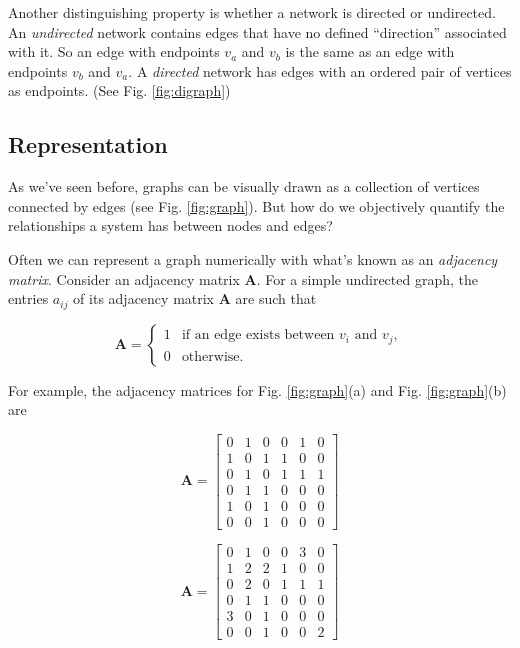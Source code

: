 \documentclass{article}
\begin{document}
Another distinguishing property is whether a network is directed or undirected.  An \textit{undirected} network contains edges that have no defined ``direction'' associated with it. So an edge with endpoints $v_a$ and $v_b$ is the same as an edge with endpoints $v_b$ and $v_a$.  A \textit{directed} network has edges with an ordered pair of vertices as endpoints.  (See Fig. \ref{fig:digraph})


\subsection{Representation}
As we've seen before, graphs can be visually drawn as a collection of vertices connected by edges (see Fig. \ref{fig:graph}).  But how do we objectively quantify the relationships a system has between nodes and edges?  

Often we can represent a graph numerically with what's known as an \textit{adjacency matrix}. Consider an adjacency matrix $\textbf{A}$.  For a simple undirected graph, the entries $a_{ij}$ of its adjacency matrix $\textbf{A}$ are such that 


\begin{equation}
 \textbf{A} =
\begin{cases}
1 & \text{if an edge exists between $v_i$ and $v_j$},\\
0 & \text{otherwise}.
\end{cases}
\end{equation}

\vspace{0.4cm}

For example, the adjacency matrices for Fig. \ref{fig:graph}(a) and Fig. \ref{fig:graph}(b) are 

\begin{equation}
\textbf{A} =
    \begin{bmatrix}
    0 & 1 & 0 & 0 & 1 & 0 \\
    1 & 0 & 1 & 1 & 0 & 0 \\
    0 & 1 & 0 & 1 & 1 & 1 \\
    0 & 1 & 1 & 0 & 0 & 0 \\
    1 & 0 & 1 & 0 & 0 & 0 \\
    0 & 0 & 1 & 0 & 0 & 0 
    \end{bmatrix}
\end{equation}

\begin{equation}
\textbf{A} =
    \begin{bmatrix}
    0 & 1 & 0 & 0 & 3 & 0 \\
    1 & 2 & 2 & 1 & 0 & 0 \\
    0 & 2 & 0 & 1 & 1 & 1 \\
    0 & 1 & 1 & 0 & 0 & 0 \\
    3 & 0 & 1 & 0 & 0 & 0 \\
    0 & 0 & 1 & 0 & 0 & 2 
    \end{bmatrix}
\end{equation}
\end{document}

